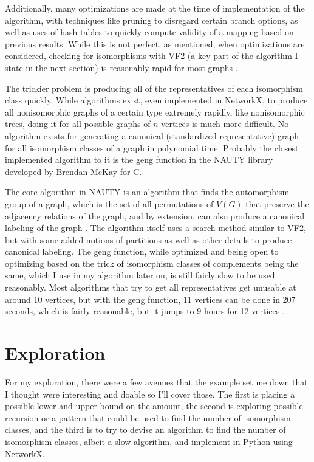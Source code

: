 \documentclass[11pt,reqno]{amsart}
\theoremstyle{definition}
\begin{document}
Additionally, many optimizations are made at the time of implementation of the algorithm, with techniques like pruning to disregard certain branch options, as well as uses of hash tables to quickly compute validity of a mapping based on previous results. While this is not perfect, as mentioned, when optimizations are considered, checking for isomorphisms with VF2 (a key part of the algorithm I state in the next section) is reasonably rapid for most graphs \cite{inproceedings}. 

The trickier problem is producing all of the representatives of each isomorphism class quickly. While algorithms exist, even implemented in NetworkX, to produce all nonisomorphic graphs of a certain type extremely rapidly, like nonisomorphic trees, doing it for all possible graphs of $n$ vertices is much more difficult. No algorithm exists for generating a canonical (standardized representative) graph for all isomorphism classes of a graph in polynomial time. Probably the closest implemented algorithm to it is the geng function in the NAUTY library developed by Brendan McKay for C. 

The core algorithm in NAUTY is an algorithm that finds the automorphism group of a graph, which is the set of all permutations of $V(G)$ that preserve the adjacency relations of the graph, and by extension, can also produce a canonical labeling of the graph \cite{MCKAY201494}. The algorithm itself uses a search method similar to VF2, but with some added notions of partitions as well as other details to produce canonical labeling. The geng function, while optimized and being open to optimizing based on the trick of isomorphism classes of complements being the same, which I use in my algorithm later on, is still fairly slow to be used reasonably. Most algorithms that try to get all representatives get unusable at around 10 vertices, but with the geng function, 11 vertices can be done in 207 seconds, which is fairly reasonable, but it jumps to 9 hours for 12 vertices \cite{timenauty}. 

\section{Exploration}
\label{sec:Exploration}

For my exploration, there were a few avenues that the example set me down that I thought were interesting and doable so I'll cover those. The first is placing a possible lower and upper bound on the amount, the second is exploring possible recursion or a pattern that could be used to find the number of isomorphism classes, and the third is to try to devise an algorithm to find the number of isomorphism classes, albeit a slow algorithm, and implement in Python using NetworkX.
\end{document}
